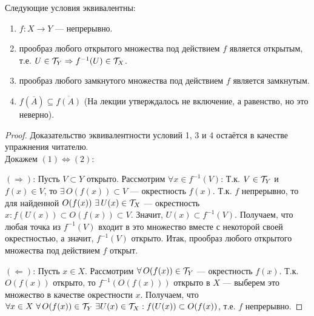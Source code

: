 \begin{statement} %
    Следующие условия эквивалентны:
    \begin{enumerate} %
        \item $f: X \rightarrow Y$ --- непрерывно.
        \item прообраз любого открытого множества под действием $f$ является открытым, т.е. $U \in \mathcal{T}_{Y} \Rightarrow f^{-1}(U) \in \mathcal{T}_{X}$.
        \item прообраз любого замкнутого множества под действием $f$ является замкнутым.
        \item $f(\overline{A}) \subseteq \overline{f(A)}$ (На лекции утверждалось не включение, а равенство, но это неверно).
    \end{enumerate}
\end{statement}
\begin{proof}
    Доказательство эквивалентности условий 1, 3 и 4 остаётся в качестве упражнения читателю. \\
    Докажем $(1) \Leftrightarrow (2)$:

    $(\Rightarrow)$: Пусть $V \subset Y$ открыто. Рассмотрим $\forall x \in f^{-1}(V)$: Т.к. $V \in \mathcal{T}_{Y}$ и $f(x) \in V$, то $\exists \, O(f(x)) \subset V$ --- окрестность $f(x)$. Т.к. $f$ непрерывно, то для найденной $O(f(x)) \ \exists \, U(x) \in \mcT_{X}$ --- окрестность $x: f(U(x)) \subset O(f(x)) \subset V$.
    Значит, $U(x) \subset f^{-1}(V)$. Получаем, что любая точка из $f^{-1}(V)$ входит в это множество вместе с некоторой своей окрестностью, а значит, $f^{-1}(V)$ открыто. Итак, прообраз любого открытого множества под действием $f$ открыт.

    $(\Leftarrow)$: Пусть $x \in X$. Рассмотрим $\forall \, O(f(x)) \in \mathcal{T}_{Y}$ --- окрестность $f(x)$. Т.к. $O(f(x))$ открыто, то $f^{-1}(O(f(x)))$ открыто в $X$ --- выберем это множество в качестве окрестности $x$. Получаем, что $\forall x \in X \ \forall \, O(f(x)) \in \mathcal{T}_{Y} \ \exists U(x) \in \mathcal{T}_{X}: f(U(x)) \subset O(f(x))$, т.е. $f$ непрерывно.
\end{proof}